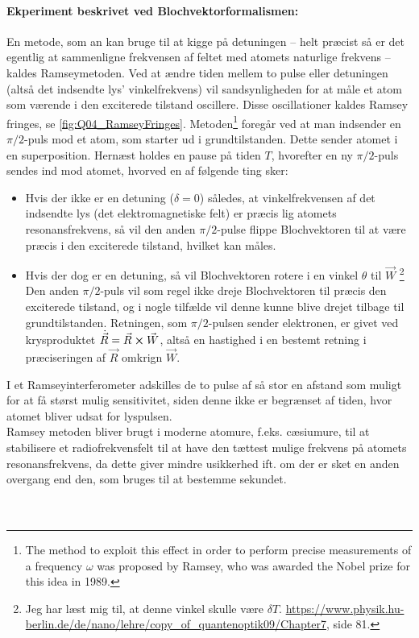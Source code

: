 \paragraph{Ekperiment beskrivet ved Blochvektorformalismen:} En metode, som an kan bruge til at kigge på detuningen -- helt præcist så er det egentlig at sammenligne frekvensen af feltet med atomets naturlige frekvens -- kaldes \textsf{Ramseymetoden}. Ved at ændre tiden mellem to pulse eller detuningen (altså det indsendte lys' vinkelfrekvens) vil sandsynligheden for at måle et atom som værende i den exciterede tilstand oscillere. Disse oscillationer kaldes \textsf{Ramsey fringes}, se \cref{fig:Q04_RamseyFringes}. Metoden\footnote{The method to exploit this effect in order to perform precise measurements of a frequency $\omega$ was proposed by Ramsey, who was awarded the Nobel prize for this idea in 1989.} foregår ved at man indsender en $\pi/2$-puls mod et atom, som starter ud i grundtilstanden. Dette sender atomet i en superposition. Hernæst holdes en pause på tiden $T$, hvorefter en ny $\pi/2$-puls sendes ind mod atomet, hvorved en af følgende ting sker:
\begin{itemize}
    \item Hvis der ikke er en detuning ($\delta = 0$) således, at vinkelfrekvensen af det indsendte lys (det elektromagnetiske felt) er præcis lig atomets resonansfrekvens, så vil den anden $\pi/2$-pulse flippe Blochvektoren til at være præcis i den exciterede tilstand, hvilket kan måles.
    \item Hvis der dog er en detuning, så vil Blochvektoren rotere i en vinkel $\theta$ til $\Vec{W}$ \footnote{Jeg har læst mig til, at denne vinkel skulle være $\delta T$. \url{https://www.physik.hu-berlin.de/de/nano/lehre/copy_of_quantenoptik09/Chapter7}, side 81.} Den anden $\pi/2$-puls vil som regel ikke dreje Blochvektoren til præcis den exciterede tilstand, og i nogle tilfælde vil denne kunne blive drejet tilbage til grundtilstanden. Retningen, som $\pi/2$-pulsen sender elektronen, er givet ved krysproduktet $\Dot{\Vec{R}} = \Vec{R} \cross \Vec{W}$, altså en hastighed i en bestemt retning i præciseringen af $\Vec{R}$ omkrign $\Vec{W}$.
\end{itemize}
I et Ramseyinterferometer adskilles de to pulse af så stor en afstand som muligt for at få størst mulig sensitivitet, siden denne ikke er begrænset af tiden, hvor atomet bliver udsat for lyspulsen.\\
Ramsey metoden bliver brugt i moderne atomure, f.eks. cæsiumure, til at stabilisere et radiofrekvensfelt til at have den tættest mulige frekvens på atomets resonansfrekvens, da dette giver mindre usikkerhed ift. om der er sket en anden overgang end den, som bruges til at bestemme sekundet.\\\\\\

